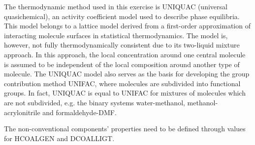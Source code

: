 The thermodynamic method used in this exercise is UNIQUAC (universal quasichemical), an activity coefficient model used to describe phase equilibria. This model belongs to a lattice model derived from a first-order approximation of interacting molecule surfaces in statistical thermodynamics. The model is, however, not fully thermodynamically consistent due to its two-liquid mixture approach. In this approach, the local concentration around one central molecule is assumed to be independent of the local composition around another type of molecule. The UNIQUAC model also serves as the basis for developing the group contribution method UNIFAC, where molecules are subdivided into functional groups. In fact, UNIQUAC is equal to UNIFAC for mixtures of molecules which are not subdivided, e.g. the binary systems water-methanol, methanol-acrylonitrile and formaldehyde-DMF. 

The non-conventional components' properties need to be defined through values for HCOALGEN and DCOALLIGT.

